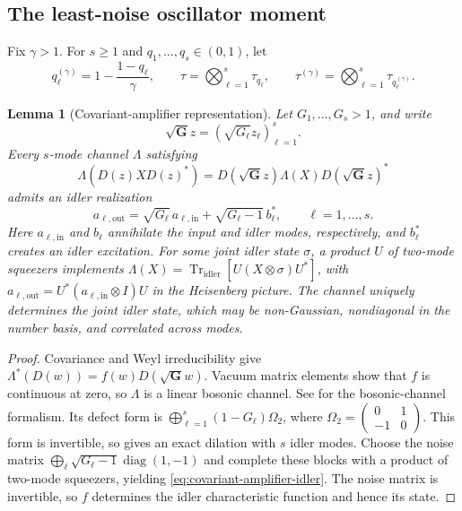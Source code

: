 \documentclass[11pt]{article}
\newtheorem{lemma}[lemma]{Lemma}
\theoremstyle{remark}
\theoremstyle{plain}
\newcommand{\diag}{\operatorname{diag}}
\newcommand{\Tr}{\operatorname{Tr}}
\begin{document}
\subsection{The least-noise oscillator moment}

Fix \(\gamma>1\).  For \(s\ge1\) and
\(q_1,\ldots,q_s\in(0,1)\), let
\[
  q_\ell^{(\gamma)}=1-\frac{1-q_\ell}{\gamma},
  \qquad
  \tau=\bigotimes_{\ell=1}^s\tau_{q_\ell},
  \qquad
  \tau^{(\gamma)}
  =\bigotimes_{\ell=1}^s\tau_{q_\ell^{(\gamma)}}.
\]

\begin{lemma}[Covariant-amplifier representation]
\label{lem:covariant-amplifier-representation}
Let \(G_1,\ldots,G_s>1\), and write
\[
  \sqrt{\mathbf G}z=(\sqrt{G_\ell}z_\ell)_{\ell=1}^s.
\]
Every \(s\)-mode channel \(\Lambda\) satisfying
\[
  \Lambda(D(z)XD(z)^*)
  =D(\sqrt{\mathbf G}z)\Lambda(X)D(\sqrt{\mathbf G}z)^*
\]
admits an idler realization
\begin{equation}\label{eq:covariant-amplifier-idler}
  a_{\ell,\mathrm{out}}
  =\sqrt{G_\ell}\,a_{\ell,\mathrm{in}}
   +\sqrt{G_\ell-1}\,b_\ell^*,
  \qquad \ell=1,\ldots,s.
\end{equation}
Here \(a_{\ell,\mathrm{in}}\) and \(b_\ell\) annihilate the
input and idler modes, respectively, and \(b_\ell^*\) creates an idler
excitation.  For some joint idler state \(\sigma\), a product \(U\) of
two-mode squeezers implements
\(\Lambda(X)=\Tr_{\mathrm{idler}}[U(X\otimes\sigma)U^*]\), with
\(a_{\ell,\mathrm{out}}=U^*(a_{\ell,\mathrm{in}}\otimes I)U\) in the
Heisenberg picture.
The channel uniquely determines the joint idler state,
which may be non-Gaussian, nondiagonal in the number basis, and
correlated across modes.
\end{lemma}

\begin{proof}
Covariance and Weyl irreducibility give
\(\Lambda^*(D(w))=f(w)D(\sqrt{\mathbf G}w)\).  Vacuum matrix elements
show that \(f\) is continuous at zero, so \(\Lambda\) is a linear
bosonic channel. See \cite[Ch.~12]{Holevo2013QuantumSystems} for the
bosonic-channel formalism.  Its defect form is
\(\bigoplus_{\ell=1}^s(1-G_\ell)\Omega_2\), where
\(\Omega_2=\left(\begin{smallmatrix}0&1\\-1&0\end{smallmatrix}\right)\).
This form is invertible, so \cite[Lemma~7]{LamiSabapathyWinter2018}
gives an exact dilation with \(s\) idler modes.  Choose the noise matrix
\(\bigoplus_\ell\sqrt{G_\ell-1}\diag(1,-1)\) and complete these
blocks with a product of two-mode squeezers, yielding
\eqref{eq:covariant-amplifier-idler}.  The noise matrix is invertible,
so \(f\) determines the idler characteristic function and hence its state.
\end{proof}
\end{document}
